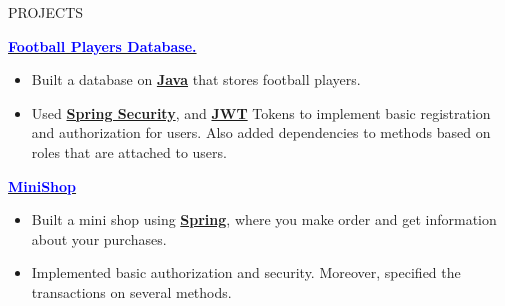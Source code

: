 \documentclass{resume} %
\begin{document}


\begin{rSection}{PROJECTS}
\vspace{-1.25em}

\item \href{https://gitlab.com/gturysbekov/football-players/-/tree/master?ref_type=heads}{\textcolor{blue}{\textbf{Football Players Database.}} {\textcolor{black}{\small \faExternalLink}}}
\vspace{-5pt} \item {} \hspace{0cm}  \hspace{0cm}  \hspace{0cm} 
\begin{itemize}
    \itemsep -5pt 
     \item Built a database on \underline {\textbf{Java}} that stores football players. 
     \item Used \underline{\textbf{Spring Security}}, and \underline{\textbf{JWT}} Tokens to implement basic registration and authorization for users. Also added dependencies to methods based on roles that are attached to users.
 \end{itemize}

 \item \href{https://gitlab.com/gturysbekov/minishop/-/tree/master?ref_type=heads}{\textcolor{blue}{\textbf{MiniShop}} {\textcolor{black}{\small \faExternalLink}}} 
\vspace{-5pt} \item {} \hspace{0cm}  \hspace{0cm} 
\begin{itemize}
    \itemsep -5pt 
     \item Built a mini shop using \underline {\textbf{Spring}}, where you make order and get information about your purchases. 
     \item Implemented basic authorization and security. Moreover, specified the transactions on several methods.
 \end{itemize}


\end{rSection}
\end{document}
